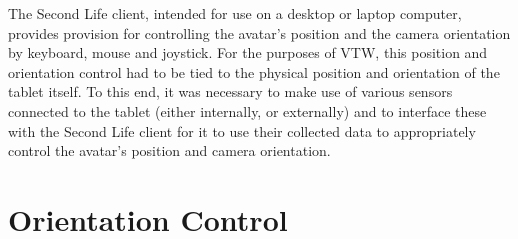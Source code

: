 The Second Life client, intended for use on a desktop or laptop computer, provides provision for controlling the avatar's position and the camera orientation by keyboard, mouse and joystick. For the purposes of VTW, this position and orientation control had to be tied to the physical position and orientation of the tablet itself. To this end, it was necessary to make use of various sensors connected to the tablet (either internally, or externally) and to interface these with the Second Life client for it to use their collected data to appropriately control the avatar's position and camera orientation.







\section{Orientation Control}

